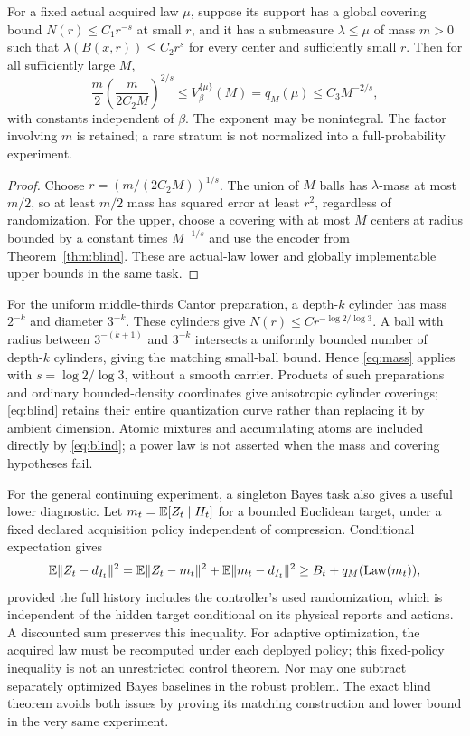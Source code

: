\begin{corollary}\label{cor:mass}
For a fixed actual acquired law $\mu$, suppose its support has a global covering bound $N(r)\le C_1r^{-s}$ at small $r$, and it has a submeasure $\lambda\le\mu$ of mass $m>0$ such that
$\lambda(B(x,r))\le C_2r^s$ for every center and sufficiently small $r$. Then for all sufficiently large $M$,
\begin{equation}\label{eq:mass}
 \frac m2\left(\frac{m}{2C_2M}\right)^{2/s}
 \le V_\beta^{\{\mu\}}(M)=q_M(\mu)
 \le C_3M^{-2/s},
\end{equation}
with constants independent of $\beta$. The exponent may be nonintegral. The factor involving $m$ is retained; a rare stratum is not normalized into a full-probability experiment.
\end{corollary}
\begin{proof}
Choose $r=(m/(2C_2M))^{1/s}$. The union of $M$ balls has $\lambda$-mass at most $m/2$, so at least $m/2$ mass has squared error at least $r^2$, regardless of randomization. For the upper, choose a covering with at most $M$ centers at radius bounded by a constant times $M^{-1/s}$ and use the encoder from Theorem~\ref{thm:blind}. These are actual-law lower and globally implementable upper bounds in the same task.
\end{proof}

For the uniform middle-thirds Cantor preparation, a depth-$k$ cylinder has mass $2^{-k}$ and diameter $3^{-k}$. These cylinders give $N(r)\le C r^{-\log2/\log3}$. A ball with radius between $3^{-(k+1)}$ and $3^{-k}$ intersects a uniformly bounded number of depth-$k$ cylinders, giving the matching small-ball bound. Hence \eqref{eq:mass} applies with $s=\log2/\log3$, without a smooth carrier. Products of such preparations and ordinary bounded-density coordinates give anisotropic cylinder coverings; \eqref{eq:blind} retains their entire quantization curve rather than replacing it by ambient dimension. Atomic mixtures and accumulating atoms are included directly by \eqref{eq:blind}; a power law is not asserted when the mass and covering hypotheses fail.

For the general continuing experiment, a singleton Bayes task also gives a useful lower diagnostic. Let $m_t=\mathbb E[Z_t\mid H_t]$ for a bounded Euclidean target, under a fixed declared acquisition policy independent of compression. Conditional expectation gives
\[
 \mathbb E\|Z_t-d_{I_t}\|^2
 =\mathbb E\|Z_t-m_t\|^2+\mathbb E\|m_t-d_{I_t}\|^2
 \ge B_t+q_M(\operatorname{Law}(m_t)),
\]
provided the full history includes the controller's used randomization, which is independent of the hidden target conditional on its physical reports and actions. A discounted sum preserves this inequality. For adaptive optimization, the acquired law must be recomputed under each deployed policy; this fixed-policy inequality is not an unrestricted control theorem. Nor may one subtract separately optimized Bayes baselines in the robust problem. The exact blind theorem avoids both issues by proving its matching construction and lower bound in the very same experiment.
